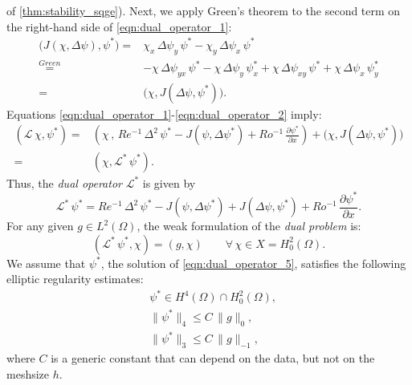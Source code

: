 of \autoref{thm:stability_sqge}).
Next, we apply Green's theorem to the second term on the right-hand side of
\eqref{eqn:dual_operator_1}:
\begin{align}
  \biggl( J(\chi , \Delta \psi) , \psi^* \biggr) =& \chi_x \, \Delta \psi_y \, \psi^*
     - \chi_y \, \Delta \psi_x \, \psi^* \nonumber \\
  \stackrel{Green}{=}& - \chi \, \Delta \psi_{y x} \, \psi^* - \chi \, \Delta
    \psi_y \, \psi^*_x + \chi \, \Delta \psi_{x y} \, \psi^* + \chi \, \Delta
    \psi_x \, \psi^*_y \nonumber \\
  =& \biggl( \chi , J(\Delta \psi , \psi^*) \biggr) .
  \label{eqn:dual_operator_2}
\end{align}
Equations \eqref{eqn:dual_operator_1}-\eqref{eqn:dual_operator_2} imply:
\begin{align}
  (\mathcal{L} \, \chi , \psi^*) =& \left( \chi \, , \, Re^{-1} \, \Delta^2 \, \psi^*
    - J(\psi , \Delta \psi^* ) + Ro^{-1} \, \frac{\partial \psi^*}{\partial x} \right)
    + \biggl( \chi , J(\Delta \psi , \psi^*) \biggr) \nonumber \\
  =& ( \chi , \mathcal{L}^* \, \psi^*) .
  \label{eqn:dual_operator_3}
\end{align}
Thus, the \emph{dual operator} $\mathcal{L}^*$ is given by
\begin{equation}
  \mathcal{L}^* \, \psi^* = Re^{-1} \, \Delta^2 \, \psi^* - J(\psi , \Delta \psi^* )
    + J(\Delta \psi , \psi^* ) + Ro^{-1} \, \frac{\partial \psi^*}{\partial x} .
  \label{eqn:dual_operator_4}
\end{equation}
For any given $g \in L^2(\Omega)$, the weak formulation of the \emph{dual
problem} is:
\begin{equation}
  ( \mathcal{L}^* \, \psi^* , \chi ) = (g , \chi)
    \qquad \forall \, \chi \in X = H_0^2(\Omega) .
  \label{eqn:dual_operator_5}
\end{equation}
We assume that $\psi^*$, the solution of \eqref{eqn:dual_operator_5}, satisfies
the following elliptic regularity estimates:
\begin{align}
  & \psi^* \in H^4(\Omega) \cap H^2_0(\Omega), \label{eqn:dual_operator_6a} \\[0.2cm]
  & \| \psi^* \|_4 \le C \, \|g\|_{0}, \label{eqn:dual_operator_6b} \\[0.2cm]
  & \| \psi^* \|_3 \le C \, \|g\|_{-1}, \label{eqn:dual_operator_6c}
\end{align}
where $C$ is a generic constant that can depend on the data, but not on the
meshsize $h$.
